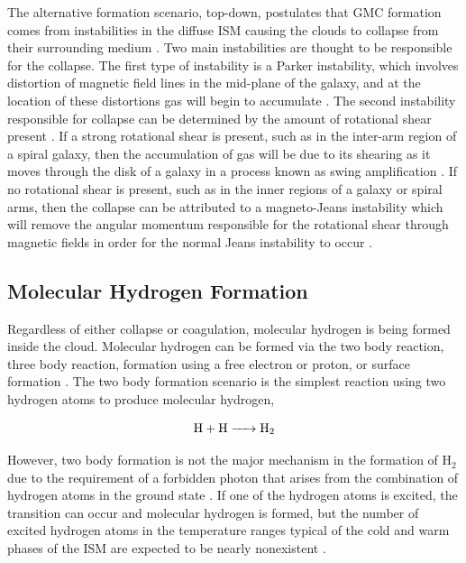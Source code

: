 The alternative formation scenario, top-down, postulates that GMC formation comes from instabilities in the diffuse ISM causing the clouds to collapse from their surrounding medium \citep{mckee2007}.  Two main instabilities are thought to be responsible for the collapse.  The first type of instability is a Parker instability, which involves distortion of magnetic field lines in the mid-plane of the galaxy, and at the location of these distortions gas will begin to accumulate \citep{parker1966, dobbs2013}.  The second instability responsible for collapse can be determined by the amount of rotational shear present \citep{mckee2007}.  If a strong rotational shear is present, such as in the inter-arm region of a spiral galaxy, then the accumulation of gas will be due to its shearing as it moves through the disk of a galaxy in a process known as swing amplification \citep{mckee2007, dobbs2013}.  If no rotational shear is present, such as in the inner regions of a galaxy or spiral arms, then the collapse can be attributed to a magneto-Jeans instability which will remove the angular momentum responsible for the rotational shear through magnetic fields in order for the normal Jeans instability to occur \citep{elmegreen1987,kim2001}.

\subsection{Molecular Hydrogen Formation}\label{h2form}

Regardless of either collapse or coagulation, molecular hydrogen is being formed inside the cloud.  Molecular hydrogen can be formed via the two body reaction, three body reaction, formation using a free electron or proton, or surface formation \citep{krumholz2014}.  The two body formation scenario is the simplest reaction using two hydrogen atoms to produce molecular hydrogen,

\begin{equation}\label{eq:2bod}
  \ce{H + H -> H_2}
\end{equation}

However, two body formation is not the major mechanism in the formation of H$_2$ due to the requirement of a forbidden photon that arises from the combination of hydrogen atoms in the ground state \citep{gould1963}.  If one of the hydrogen atoms is excited, the transition can occur and molecular hydrogen is formed, but the number of excited hydrogen atoms in the temperature ranges typical of the cold and warm phases of the ISM are expected to be nearly nonexistent \citep{krumholz2014}.

